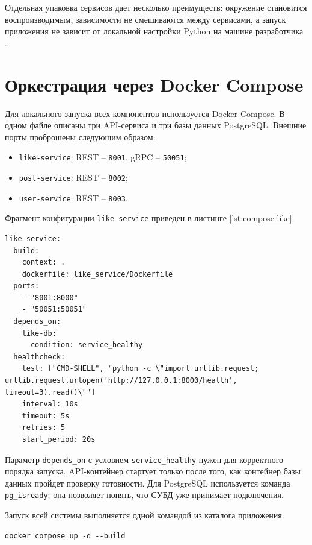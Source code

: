 Отдельная упаковка сервисов дает несколько преимуществ: окружение становится воспроизводимым,
зависимости не смешиваются между сервисами, а запуск приложения не зависит от локальной настройки
Python на машине разработчика \cite{docker_compose_docs}.

\section{Оркестрация через Docker Compose}

Для локального запуска всех компонентов используется Docker Compose. В одном файле описаны три
API-сервиса и три базы данных PostgreSQL. Внешние порты проброшены следующим образом:
\begin{itemize}
    \item \texttt{like-service}: REST -- \texttt{8001}, gRPC -- \texttt{50051};
    \item \texttt{post-service}: REST -- \texttt{8002};
    \item \texttt{user-service}: REST -- \texttt{8003}.
\end{itemize}

Фрагмент конфигурации \texttt{like-service} приведен в листинге \ref{lst:compose-like}.

\begin{lstlisting}[caption={Фрагмент docker-compose.yml для like-service}, label={lst:compose-like}]
like-service:
  build:
    context: .
    dockerfile: like_service/Dockerfile
  ports:
    - "8001:8000"
    - "50051:50051"
  depends_on:
    like-db:
      condition: service_healthy
  healthcheck:
    test: ["CMD-SHELL", "python -c \"import urllib.request; urllib.request.urlopen('http://127.0.0.1:8000/health', timeout=3).read()\""]
    interval: 10s
    timeout: 5s
    retries: 5
    start_period: 20s
\end{lstlisting}

Параметр \texttt{depends\_on} с условием \texttt{service\_healthy} нужен для корректного порядка
запуска. API-контейнер стартует только после того, как контейнер базы данных пройдет проверку
готовности. Для PostgreSQL используется команда \texttt{pg\_isready}; она позволяет понять, что
СУБД уже принимает подключения.

Запуск всей системы выполняется одной командой из каталога приложения:
\begin{lstlisting}[caption={Запуск контейнеров проекта}]
docker compose up -d --build
\end{lstlisting}

